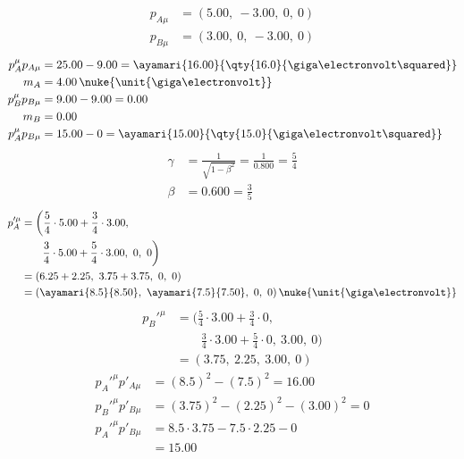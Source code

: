 \begin{align*}
  p_{A\mu}&=(5.00,\ -3.00,\ 0,\ 0)\\
  p_{B\mu}&=(3.00,\ 0,\ -3.00,\ 0)
\end{align*}
\begin{align*}
  p_{A}^{\mu}p_{A\mu}&=25.00-9.00=\ayamari{16.00}{\qty{16.0}{\giga\electronvolt\squared}}\\
  m_{A}&=4.00\,\nuke{\unit{\giga\electronvolt}}\\
  p_{B}^{\mu}p_{B\mu}&=9.00-9.00=0.00\\
  m_{B}&=0.00\\
  p_{A}^{\mu}p_{B\mu}&=15.00-0=\ayamari{15.00}{\qty{15.0}{\giga\electronvolt\squared}}
\end{align*}
\begin{align*}
  \gamma&=\frac{1}{\sqrt{1-\beta^{2}}}=\frac{1}{0.800}=\frac{5}{4}\\
  \beta&=0.600=\frac{3}{5}
\end{align*}
\begin{align*}
  p_{A}'^{\mu}&=\biggl(\frac{5}{4}\cdot5.00+\frac{3}{4}\cdot3.00,\\
  &\qquad\frac{3}{4}\cdot5.00+\frac{5}{4}\cdot3.00,\ 0,\ 0\biggr)\\
  &=(6.25+2.25,\ 3.75+3.75,\ 0,\ 0)\\
  &=(\ayamari{8.5}{8.50},\ \ayamari{7.5}{7.50},\ 0,\ 0)\,\nuke{\unit{\giga\electronvolt}}
\end{align*}
\begin{align*}
  p_{B}'^{\mu}&=\biggl(\frac{5}{4}\cdot3.00+\frac{3}{4}\cdot0,\\
  &\qquad\frac{3}{4}\cdot3.00+\frac{5}{4}\cdot0,\ 3.00,\ 0\biggr)\\
  &=(3.75,\ 2.25,\ 3.00,\ 0)
\end{align*}
\begin{align*}
  p_{A}'^{\mu}p'_{A\mu}&=(8.5)^{2}-(7.5)^{2}=16.00\\
  p_{B}'^{\mu}p'_{B\mu}&=(3.75)^{2}-(2.25)^{2}-(3.00)^{2}=0\\
  p_{A}'^{\mu}p'_{B\mu}&=8.5\cdot3.75-7.5\cdot2.25-0\\
  &=15.00
\end{align*}
